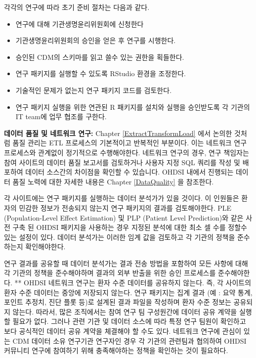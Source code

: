 \documentclass[11pt]{book}
\providecommand{\tightlist}{%
  \setlength{\itemsep}{0pt}\setlength{\parskip}{0pt}}
\theoremstyle{definition}
\theoremstyle{definition}
\theoremstyle{definition}
\theoremstyle{remark}
\let\BeginKnitrBlock\begin \let\EndKnitrBlock\end
\begin{document}
각각의 연구에 따라 초기 준비 절차는 다음과 같다.

\begin{itemize}
\tightlist
\item
  연구에 대해 기관생명윤리위원회에 신청한다
\item
  기관생명윤리위원회의 승인을 얻은 후 연구를 시행한다.
\item
  승인된 CDM의 스키마를 읽고 쓸수 있는 권한을 획들한다.
\item
  연구 패키지를 실행할 수 있도록 RStudio 환경을 조정한다.
\item
  기술적인 문제가 없는지 연구 패키지 코드를 검토한다.
\item
  연구 패키지 실행을 위한 연관된 R 패키지를 설치와 실행을 승인받도록 각
  기관의 IT team에 업무 협조를 구한다.
\end{itemize}

\BeginKnitrBlock{rmdimportant}
\textbf{데이터 품질 및 네트워크 연구:} Chapter
\ref{ExtractTransformLoad} 에서 논의한 것처럼 품질 관리는 ETL 프로세스의
기본적이고 반복적인 부분이다. 이는 네트워크 연구 프로세스와 관계없이
정기적으로 수행해야한다. 네트워크 연구의 경우, 연구 책임자는 참여
사이트의 데이터 품질 보고서를 검토하거나 사용자 지정 SQL 쿼리를 작성 및
배포하여 데이터 소스간의 차이점을 확인할 수 있습니다. OHDSI 내에서
진행되는 데이터 품질 노력에 대한 자세한 내용은 Chapter \ref{DataQuality}
을 참조한다.
\EndKnitrBlock{rmdimportant}

각 사이트에는 연구 패키지를 실행하는 데이터 분석가가 있을 것이다. 이
인원들은 환자의 민감한 정보가 전송되지 않는지 연구 패키지의 결과를
검토해야한다. PLE (Population-Level Effect Estimation) 및 PLP (Patient
Level Prediction)와 같은 사전 구축 된 OHDSI 패키지을 사용하는 경우
지정된 분석에 대한 최소 셀 수를 정할수 있는 설정이 있다. 데이터 분석가는
이러한 임계 값을 검토하고 각 기관의 정책을 준수하는지 확인해야한다.

연구 결과를 공유할 때 데이터 분석가는 결과 전송 방법을 포함하여 모든
사항에 대해 각 기관의 정책을 준수해야하며 결과의 외부 반출을 위한 승인
프로세스를 준수해야한다. ** OHDSI 네트워크 연구는 환자 수준 데이터를
공유하지 않는다. 즉, 각 사이트의 환자 수준 데이터는 중앙에 저장되지
않는다. 연구 패키지는 집계 결과 (예 : 요약 통계, 포인트 추정치, 진단
플롯 등)로 설계된 결과 파일을 작성하며 환자 수준 정보는 공유되지 않는다.
따라서, 많은 조직에서는 참여 연구 팀 구성원간에 데이터 공유 계약을
실행할 필요가 없다. 그러나 관련 기관 및 데이터 소스에 따라 특정 연구
팀원이 확인하고 보다 공식적인 데이터 공유 계약을 체결해야 할 수도 있다.
네트워크 연구에 관심이 있는 CDM 데이터 소유 연구기관 연구자인 경우 각
기관의 관련팀과 협의하여 OHDSI 커뮤니티 연구에 참여하기 위해
충족해야하는 정책을 확인하는 것이 필요하다.
\end{document}
